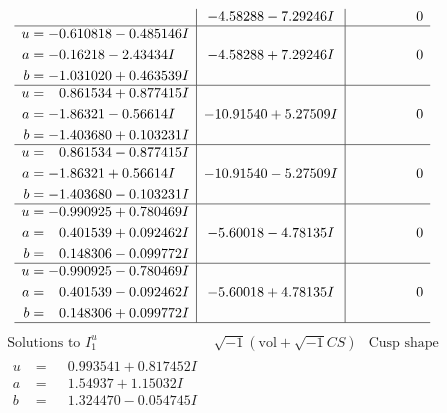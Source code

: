 \documentclass[1p]{elsarticle_modified}
\theoremstyle{definition}
\newcommand{\I}{\sqrt{-1}}
\begin{document}
$$\begin{array}{c|c|c}
 & -4.58288 - 7.29246 I & \phantom{-0.000000 } 0 \\ \hline\begin{aligned}
u &= -0.610818 - 0.485146 I \\
a &= -0.16218 - 2.43434 I \\
b &= -1.031020 + 0.463539 I\end{aligned}
 & -4.58288 + 7.29246 I & \phantom{-0.000000 } 0 \\ \hline\begin{aligned}
u &= \phantom{-}0.861534 + 0.877415 I \\
a &= -1.86321 - 0.56614 I \\
b &= -1.403680 + 0.103231 I\end{aligned}
 & -10.91540 + 5.27509 I & \phantom{-0.000000 } 0 \\ \hline\begin{aligned}
u &= \phantom{-}0.861534 - 0.877415 I \\
a &= -1.86321 + 0.56614 I \\
b &= -1.403680 - 0.103231 I\end{aligned}
 & -10.91540 - 5.27509 I & \phantom{-0.000000 } 0 \\ \hline\begin{aligned}
u &= -0.990925 + 0.780469 I \\
a &= \phantom{-}0.401539 + 0.092462 I \\
b &= \phantom{-}0.148306 - 0.099772 I\end{aligned}
 & -5.60018 - 4.78135 I & \phantom{-0.000000 } 0 \\ \hline\begin{aligned}
u &= -0.990925 - 0.780469 I \\
a &= \phantom{-}0.401539 - 0.092462 I \\
b &= \phantom{-}0.148306 + 0.099772 I\end{aligned}
 & -5.60018 + 4.78135 I & \phantom{-0.000000 } 0\\
 \hline 
 \end{array}$$\newpage$$\begin{array}{c|c|c}  
\text{Solutions to }I^u_{1}& \I (\text{vol} + \sqrt{-1}CS) & \text{Cusp shape}\\
 \hline 
\begin{aligned}
u &= \phantom{-}0.993541 + 0.817452 I \\
a &= \phantom{-}1.54937 + 1.15032 I \\
b &= \phantom{-}1.324470 - 0.054745 I\end{aligned}

\end{array}$$
\end{document}
